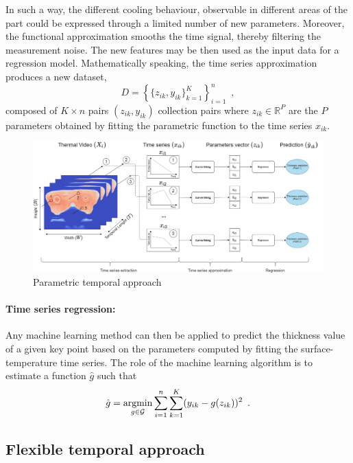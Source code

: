 In such a way, the different cooling behaviour, observable in different areas of the part could be expressed through a limited number of new parameters. Moreover, the functional approximation smooths the time signal, thereby filtering the measurement noise. The new features may be then used as the input data for a regression model.
Mathematically speaking, the time series approximation produces a new dataset,
%
\begin{equation}
    D = \left\{\{z_{ik},y_{ik}\}_{k=1}^K\right\}_{i=1}^n
    \enspace,
\end{equation}
%
composed of $K\times n$ pairs $(z_{ik},y_{ik})$ collection pairs where ${z}_{ik} \in \mathds{R}^{P}$ are the $P$ parameters obtained by fitting the parametric function to the time series $x_{ik}$.

\begin{figure}
\centering
\includegraphics[scale=0.4]{images/chapter_4/Parametric_Temporal.png}
\caption{Parametric temporal approach}
\label{fig:parametric_temporal_approach}
\end{figure}

\paragraph{Time series regression:}
Any machine learning method can then be applied to predict the thickness value of a given key point based on the parameters computed by fitting the surface-temperature time series.  The role of the machine learning algorithm is to estimate a function $\hat{g}$ such that
\begin{equation}
    \hat{g} = \operatorname*{argmin}_{g \in \mathcal{G}} \sum_{i=1}^n \sum_{k=1}^K (y_{ik} - g(z_{ik}))^2 \enspace.
\end{equation}


\subsection{Flexible temporal approach}

